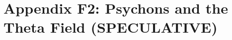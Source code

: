 
\appendix
\section{Appendix F2: Psychons and the Theta Field (SPECULATIVE)}
\label{app:psychons_speculative}

